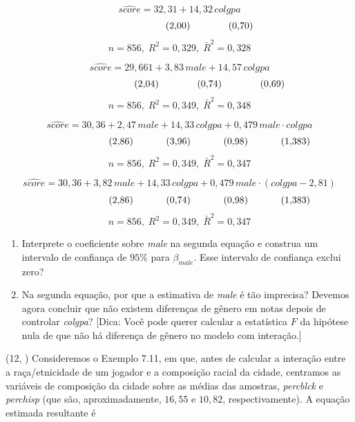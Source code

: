 \documentclass[12pt,letterpaper, onecolumn]{exam}
\begin{document}
\begin{questions}
\[
\widehat{score} = 32{,}31 + 14{,}32\,colgpa
\]
\[
\hspace{2.2cm} (2{,}00)\hspace{1.4cm}(0{,}70)
\]
\[
n = 856,\; R^2 = 0{,}329,\; \bar{R}^2 = 0{,}328
\]

\[
\widehat{score} = 29{,}661 + 3{,}83\,male + 14{,}57\,colgpa
\]
\[
\hspace{2.2cm} (2{,}04)\hspace{1.4cm}(0{,}74)\hspace{1.4cm}(0{,}69)
\]
\[
n = 856,\; R^2 = 0{,}349,\; \bar{R}^2 = 0{,}348
\]

\[
\widehat{score} = 30{,}36 + 2{,}47\,male + 14{,}33\,colgpa + 0{,}479\,male \cdot colgpa
\]
\[
\hspace{2.2cm} (2{,}86)\hspace{1.2cm}(3{,}96)\hspace{1.2cm}(0{,}98)\hspace{1.2cm}(1{,}383)
\]
\[
n = 856,\; R^2 = 0{,}349,\; \bar{R}^2 = 0{,}347
\]

\[
\widehat{score} = 30{,}36 + 3{,}82\,male + 14{,}33\,colgpa + 0{,}479\,male \cdot (colgpa - 2{,}81)
\]
\[
\hspace{2.2cm} (2{,}86)\hspace{1.2cm}(0{,}74)\hspace{1.2cm}(0{,}98)\hspace{1.2cm}(1{,}383)
\]
\[
n = 856,\; R^2 = 0{,}349,\; \bar{R}^2 = 0{,}347
\]

\begin{enumerate}[label=(\roman*)]
    \item Interprete o coeficiente sobre \textit{male} na segunda equação e construa um intervalo de confiança de \(95\%\) para \(\beta_{male}\). Esse intervalo de confiança exclui zero?
    \item Na segunda equação, por que a estimativa de \textit{male} é tão imprecisa? Devemos agora concluir que não existem diferenças de gênero em notas depois de controlar \textit{colgpa}? [Dica: Você pode querer calcular a estatística \(F\) da hipótese nula de que não há diferença de gênero no modelo com interação.]
\end{enumerate}

\vspace{0.7cm}

\question (12, \citep{wooldridge2016}) Consideremos o Exemplo 7.11, em que, antes de calcular a interação entre a raça/etnicidade de um jogador e a composição racial da cidade, centramos as variáveis de composição da cidade sobre as médias das amostras, \textit{percblck} e \textit{perchisp} (que são, aproximadamente, \(16{,}55\) e \(10{,}82\), respectivamente). A equação estimada resultante é


\end{questions}
\end{document}
